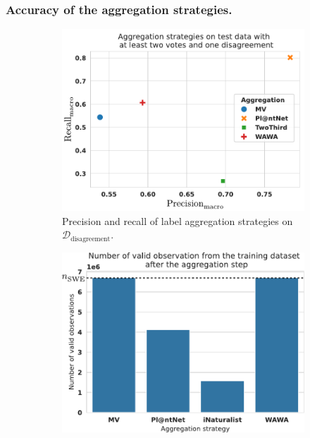 \subsubsection{Accuracy of the aggregation strategies.}

\begin{figure}[htb]
    \centering
    \begin{subfigure}[t]{.48\textwidth}
        \centering
    \includegraphics[width=\textwidth]{./images_plantnet/precision_and_recall_one_disagreeement__macro.pdf}
    \caption{Precision and recall of label aggregation strategies on $\mathcal{D}_\text{disagreement}$. }
        \label{fig:precision-recall}
    \end{subfigure}%
    \hfill
    \begin{subfigure}[t]{.48\textwidth}
        \centering
    \includegraphics[width=\textwidth]{./images_plantnet/volume_train_data.pdf}

\end{subfigure}
\end{figure}
